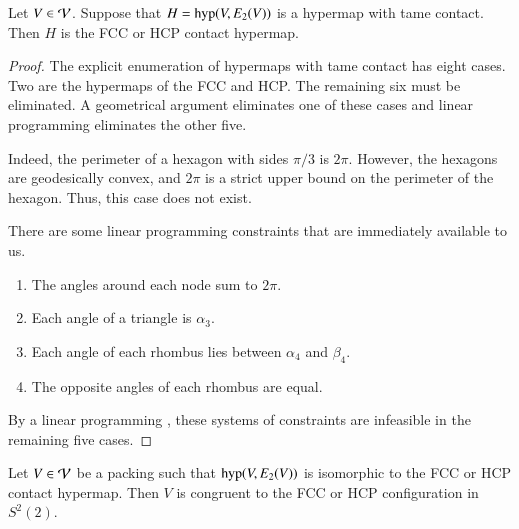 \documentclass{llncs}
\def\op#1{{\hbox{#1}}}
\begin{document}
\begin{lemma}\label{lemma:fcc-ft} Let $V\in {\mathcal V}$.
  Suppose that $H=\op{hyp}(V,E_2(V))$ is a hypermap with tame
  contact.  Then $H$ is the FCC or HCP contact hypermap.
\end{lemma}

\begin{proof} The explicit enumeration of hypermaps with tame
  contact has eight cases.  Two are the hypermaps of the
  FCC and HCP.  The remaining six must be eliminated.  
A geometrical argument  eliminates one of these cases and linear programming
eliminates the other five.

  Indeed, the perimeter of a hexagon with sides $\pi/3$
is $2\pi$.  However, the hexagons are geodesically convex,
 and $2\pi$ is a strict upper bound on the perimeter of the
hexagon.  Thus, this case does not exist.



There are some linear
  programming constraints that are immediately available to us.
\begin{enumerate}\wasitemize 
\item The angles around each node sum to $2\pi$.
\item Each angle of a triangle is $\alpha_3$.
\item Each angle of each rhombus lies between $\alpha_4$ and $\beta_4$.
\item The opposite angles of each rhombus are equal.
\end{enumerate}\wasitemize 
By a linear programming ,
these systems of constraints are infeasible in the remaining five cases.
\end{proof}


\begin{lemma}\label{lemma:kiss-fcc}
  Let $V\in {\mathcal V}$ be a packing such that $\op{hyp}(V,E_2(V))$ is
  isomorphic to the FCC or HCP contact hypermap.  Then $V$ is
  congruent to the FCC or HCP configuration in $S^2(2)$.
\end{lemma}
%
%
%
%
\end{document}
